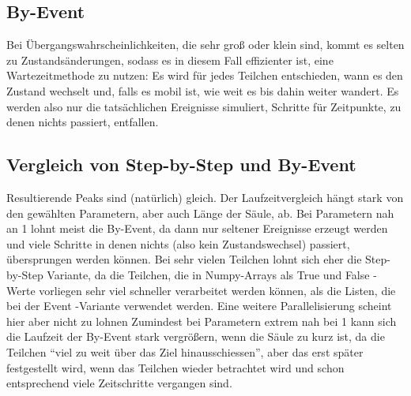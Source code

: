 
\subsection{By-Event}
Bei Übergangswahrscheinlichkeiten, die sehr groß oder klein sind, kommt es selten zu Zustandsänderungen, sodass es in diesem Fall effizienter ist, eine Wartezeitmethode zu nutzen: Es wird für jedes Teilchen entschieden, wann es den Zustand wechselt und, falls es mobil ist, wie weit es bis dahin weiter wandert. Es werden also nur die tatsächlichen Ereignisse simuliert, Schritte für Zeitpunkte, zu denen nichts passiert, entfallen.

\subsection{Vergleich von Step-by-Step und By-Event}
Resultierende Peaks sind (natürlich) gleich. Der Laufzeitvergleich hängt stark von den gewählten Parametern, aber auch Länge der Säule, ab.
Bei Parametern nah an 1 lohnt meist die By-Event, da dann nur seltener Ereignisse erzeugt werden und viele Schritte in denen nichts (also kein Zustandswechsel) passiert, übersprungen werden können.
Bei sehr vielen Teilchen lohnt sich eher die Step-by-Step Variante, da die Teilchen, die in Numpy-Arrays als True und False - Werte vorliegen sehr viel schneller verarbeitet werden können, als die Listen, die bei der Event -Variante verwendet werden. Eine weitere Parallelisierung scheint hier aber nicht zu lohnen
Zumindest bei Parametern extrem nah bei 1 kann sich die Laufzeit der By-Event stark vergrößern, wenn die Säule zu kurz ist, da die Teilchen ``viel zu weit über das Ziel hinausschiessen'', aber das erst später festgestellt wird, wenn das Teilchen wieder betrachtet wird und schon entsprechend viele Zeitschritte vergangen sind. 


